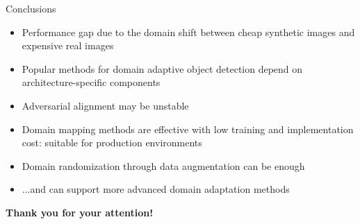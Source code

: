 \documentclass[aspectratio=141]{beamer}
\newcommand\pro{\item[\faThumbsOUp]}
\newcommand\con{\item[\faThumbsODown]}
\begin{document}
\begin{frame}{Conclusions}
    \begin{itemize}
        \item<1-> Performance gap due to the domain shift between cheap synthetic images and expensive real images
        \vspace*{5mm}
        \con<2-> Popular methods for domain adaptive object detection depend on architecture-specific components
        \con<2-> Adversarial alignment may be unstable 
        \pro<2-> Domain mapping methods are effective with low training and implementation cost: suitable for production environments
        \vspace*{5mm}
        \item<3-> Domain randomization through data augmentation can be enough
        \item<3-> ...and can support more advanced domain adaptation methods
    \end{itemize}
\end{frame}


\begin{frame}[plain]
    \begin{center}
        \color{white}
        \huge\bf Thank you for your attention!
    \end{center}
\end{frame}
\end{document}
